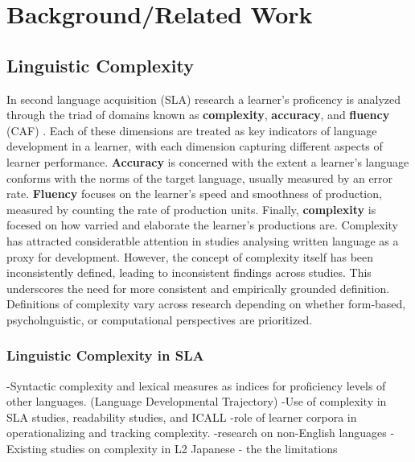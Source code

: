 \chapter{Background/Related Work}

\section{Linguistic Complexity}

In second language acquisition (SLA) research a learner's proficency is analyzed through the triad of domains known
as \textbf{complexity}, \textbf{accuracy}, and \textbf{fluency} (CAF) \cite{Skehan1989,ellis2003}. Each of these
dimensions are treated as key indicators of language development in a learner, with each dimension capturing different
aspects of learner performance. \textbf{Accuracy} is concerned with the extent a learner's language conforms with
the norms of the target language, usually measured by an error rate. \textbf{Fluency} focuses on the learner's speed
and smoothness of production, measured by counting the rate of production units. Finally, \textbf{complexity} is
focesed on how varried and elaborate the learner's productions are. Complexity has attracted consideratble attention
in studies analysing written language as a proxy for development. However, the concept of complexity itself has
been inconsistently defined, leading to inconsistent findings across studies.  This underscores the need for more
consistent and empirically grounded definition.
Definitions of complexity vary across research depending on whether form-based, psycholnguistic, or computational
perspectives are prioritized.

\subsection{Linguistic Complexity in SLA}
-Syntactic complexity and lexical measures as indices for proficiency levels of other languages. (Language Developmental Trajectory)
-Use of complexity in SLA studies, readability studies, and ICALL
-role of learner corpora in operationalizing and tracking complexity.
-research on non-English languages
-Existing studies on complexity in L2 Japanese - the the limitations



